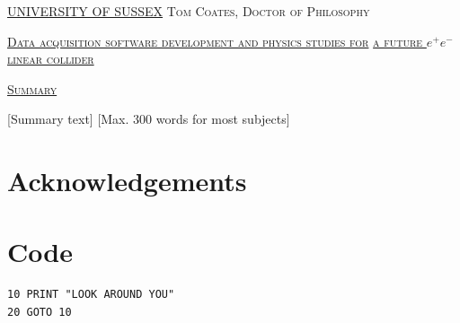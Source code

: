 \documentclass[a4paper,11pt]{report}
\newcommand{\linespacing}{1.5}
\renewcommand{\baselinestretch}{\linespacing}
\begin{document}
\thispagestyle{empty}
\newpage
\null\vskip10mm
\begin{center}
\large
\underline{UNIVERSITY OF SUSSEX}
\vskip20mm
\textsc{Tom Coates, Doctor of Philosophy}
\vskip20mm
\begin{center}
	\scshape
	\underline{Data acquisition software development and physics studies for}
	\underline{a future $e^+e^-$ linear collider}
\end{center}
\vskip0mm
\vskip20mm
\underline{\textsc{Summary}}
\vskip2mm
\end{center}
\renewcommand{\baselinestretch}{1.0}
\small\normalsize
[Summary text] [Max. 300 words for most subjects]

\chapter*{Acknowledgements}
\renewcommand{\baselinestretch}{\linespacing}
\small\normalsize

%


\newpage
{}
\tableofcontents

\newpage
{}

 \label{intro}

 \label{colliders}

 \label{daq}

 \label{aida2020testbeams}

 \label{ideatestbeam}

 \label{physics}

 \label{discussion}

\clearpage
{}
{}


\appendix

\chapter{Code} \label{appenddix/code}

\begin{verbatim}
10 PRINT "LOOK AROUND YOU"
20 GOTO 10
\end{verbatim}

\end{document}
